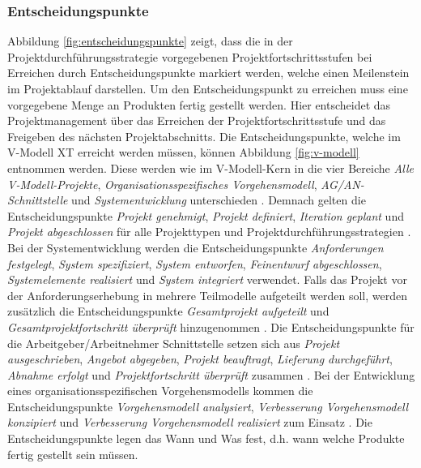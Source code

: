  \subsubsection{Entscheidungspunkte}
Abbildung \ref{fig:entscheidungspunkte} zeigt, dass die in der Projektdurchführungsstrategie vorgegebenen Projektfortschrittsstufen bei Erreichen durch Entscheidungspunkte markiert werden, welche einen Meilenstein im Projektablauf darstellen. Um den Entscheidungspunkt zu erreichen muss eine vorgegebene Menge an Produkten fertig gestellt werden. Hier entscheidet das Projektmanagement über das Erreichen der Projektfortschrittsstufe und das Freigeben des nächsten Projektabschnitts. Die Entscheidungspunkte, welche im V-Modell XT erreicht werden müssen, können Abbildung \ref{fig:v-modell} entnommen werden. Diese werden wie im V-Modell-Kern in die vier Bereiche \textit{Alle V-Modell-Projekte}, \textit{Organisationsspezifisches Vorgehensmodell}, \textit{AG/AN-Schnittstelle} und \textit{Systementwicklung} unterschieden \cite{2004vmodell}. \newline
Demnach gelten die Entscheidungspunkte \textit{Projekt genehmigt}, \textit{Projekt definiert}, \textit{Iteration geplant} und \textit{Projekt abgeschlossen} für alle Projekttypen und Projektdurchführungsstrategien \cite{2004vmodell}. \newline
Bei der Systementwicklung werden die Entscheidungspunkte \textit{Anforderungen festgelegt}, \textit{System spezifiziert}, \textit{System entworfen}, \textit{Feinentwurf abgeschlossen}, \textit{Systemelemente realisiert} und \textit{System integriert} verwendet. Falls das Projekt vor der Anforderungserhebung in mehrere Teilmodelle aufgeteilt werden soll, werden zusätzlich die Entscheidungspunkte \textit{Gesamtprojekt aufgeteilt} und \textit{Gesamtprojektfortschritt überprüft} hinzugenommen \cite{2004vmodell}. \newline
Die Entscheidungspunkte für die Arbeitgeber/Arbeitnehmer Schnittstelle setzen sich aus \textit{Projekt ausgeschrieben}, \textit{Angebot abgegeben}, \textit{Projekt beauftragt}, \textit{Lieferung durchgeführt}, \textit{Abnahme erfolgt} und \textit{Projektfortschritt überprüft} zusammen \cite{2004vmodell}. \newline
 Bei der Entwicklung eines organisationsspezifischen Vorgehensmodells kommen die Entscheidungspunkte \textit{Vorgehensmodell analysiert}, \textit{Verbesserung Vorgehensmodell konzipiert} und \textit{Verbesserung Vorgehensmodell realisiert} zum Einsatz \cite{2004vmodell}. \newline
 Die Entscheidungspunkte legen das \grqq Wann\grqq {} und \grqq Was\grqq {} fest, d.h. wann welche Produkte fertig gestellt sein müssen.

